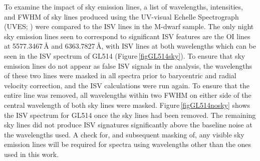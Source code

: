 To examine the impact of sky emission lines, a list of wavelengths, intensities, and FWHM of sky lines produced using the UV-visual Echelle Spectrograph (UVES; \citealt{1992Dekker}) were compared to the ISV lines in the M-dwarf sample. The only night sky emission lines seen to correspond to significant ISV features are the O\textsc{I} lines at 5577.3467\,\hbox{\AA} and 6363.7827\,\hbox{\AA}, with ISV lines at both wavelengths which can be seen in the ISV spectrum of GL514 (Figure\,\ref{figGL514sky}). To ensure that sky emission lines do not appear as false ISV signals in the analysis, the wavelengths of these two lines were masked in all spectra prior to barycentric and radial velocity correction, and the ISV calculations were run again. To ensure that the entire line was removed, all wavelengths within two FWHM on either side of the central wavelength of both sky lines were masked.  Figure\,\ref{figGL514nosky} shows the ISV spectrum for GL514 once the sky lines had been removed. The remaining sky lines did not produce ISV signatures significantly above the baseline noise at the wavelengths used. A check for, and subsequent masking of, any visible sky emission lines will be required for spectra using wavelengths other than the ones used in this work.\\

